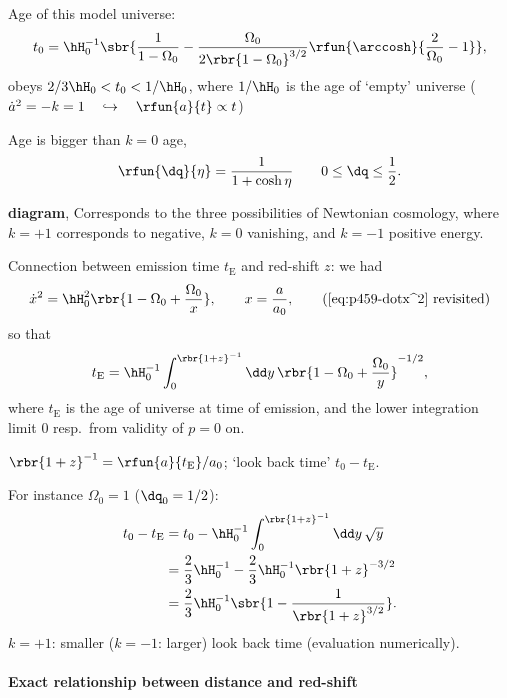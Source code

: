 Age of this model universe:
\begin{equation}
t_0 = \hH_0^{-1}\sbr{\frac{1}{1-\Omega_0} - 
\frac{\Omega_0}{2\rbr{1-\Omega_0}^{3/2}}
\rfun{\arccosh}{\frac{2}{\Omega_0}-1}},
\end{equation}
obeys $2/3\hH_0 < t_0 < 1/\hH_0$, where $1/\hH_0$ is the age of `empty' 
universe ($\dot{a}^2 = -k = 1\quad\hookrightarrow\quad\rfun{a}{t}\propto t$)

Age is bigger than $k = 0$ age,
\begin{equation}
 \rfun{\dq}{\eta} = \frac{1}{1+\cosh\eta}\qquad 0 \le \dq \le \frac{1}{2}.
\end{equation}

\textbf{diagram},
Corresponds to the three possibilities of Newtonian cosmology, where $k = +1$ 
corresponds to negative, $k=0$ vanishing, and $k = -1$ positive energy.

Connection between emission time $t_\text{E}$ and red-shift $z$: we had
\begin{equation}
\dot{x}^2 = \hH_0^2 \rbr{1 - \Omega_0 + \frac{\Omega_0}{x}},
\qquad x = \frac{a}{a_0},
\tag{\ref{eq:p459-dotx^2} revisited}
\end{equation}
so that
\begin{equation}
t_\text{E} = \hH_0^{-1}\int_0^{\rbr{1+z}^{-1}}\dd y\,
\rbr{1 - \Omega_0 + \frac{\Omega_0}{y}}^{-1/2},
\end{equation}
where $t_\text{E}$ is the age of universe at time of emission, and the lower 
integration limit $0$ resp.\ from validity of $p = 0$ on.

$\rbr{1+z}^{-1} = \rfun{a}{t_\text{E}}/a_0$; `look back time' $t_0 - 
t_\text{E}$.

For instance $\Omega_0 = 1$ ($\dq_0 = 1/2$):
\begin{align}
t_0 - t_\text{E} &= t_0 - \hH_0^{-1} \int_0^{\rbr{1+z}^{-1}}\dd y\,\sqrt{y}
\nonumber \\
&= \frac{2}{3}\hH_0^{-1} - \frac{2}{3} \hH_0^{-1}\rbr{1+z}^{-3/2}
\nonumber \\
&= \frac{2}{3}\hH_0^{-1}\sbr{1-\frac{1}{\rbr{1+z}^{3/2}}}.
\end{align}
$k=+1$: smaller ($k=-1$: larger) look back time (evaluation numerically).

\paragraph{Exact relationship between distance and red-shift}

